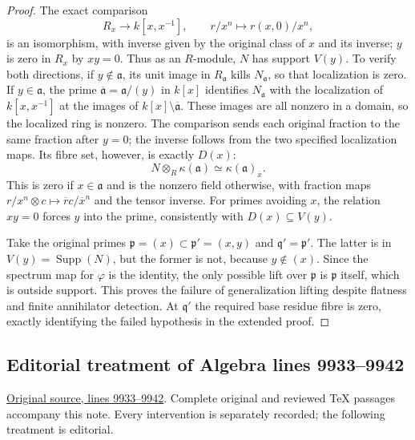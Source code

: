\begin{proof}
The exact comparison
$$
R_x\longrightarrow k[x,x^{-1}],\qquad
r/x^n\longmapsto r(x,0)/x^n,
$$
is an isomorphism, with inverse given by the
original class of $x$ and its inverse; $y$ is
zero in $R_x$ by $xy=0$. Thus as an $R$-module,
$N$ has support $V(y)$. To verify both directions,
if $y\notin\mathfrak a$, its unit image in
$R_{\mathfrak a}$ kills $N_{\mathfrak a}$,
so that localization is zero. If
$y\in\mathfrak a$, the prime
$\overline{\mathfrak a}=\mathfrak a/(y)$
in $k[x]$ identifies $N_{\mathfrak a}$ with
the localization of $k[x,x^{-1}]$ at the
images of $k[x]\setminus\overline{\mathfrak a}$.
These images are all nonzero in a domain,
so the localized ring is nonzero. The comparison
sends each original fraction to the same
fraction after $y=0$; the inverse follows from
the two specified localization maps.
Its fibre set, however, is exactly $D(x)$:
$$
N\otimes_R\kappa(\mathfrak a)
\simeq\kappa(\mathfrak a)_{\overline x}.
$$
This is zero if $x\in\mathfrak a$ and is the
nonzero field otherwise, with fraction maps
$r/x^n\otimes c\mapsto\overline r c/\overline x^n$
and the tensor inverse. For primes avoiding
$x$, the relation $xy=0$ forces $y$ into the
prime, consistently with $D(x)\subseteq V(y)$.

Take the original primes
$\mathfrak p=(x)\subset\mathfrak p'=(x,y)$
and $\mathfrak q'=\mathfrak p'$. The latter
is in $V(y)=\operatorname{Supp}(N)$, but the
former is not, because $y\notin(x)$.
Since the spectrum map for $\varphi$ is the
identity, the only possible lift over
$\mathfrak p$ is $\mathfrak p$ itself, which
is outside support. This proves the failure
of generalization lifting despite flatness
and finite annihilator detection. At
$\mathfrak q'$ the required base residue fibre
is zero, exactly identifying the failed
hypothesis in the extended proof.
\end{proof}


\subsection{Editorial treatment of Algebra lines 9933--9942}

\hypertarget{algebra-context-116}{}

\noindent\href{https://github.com/stacks/stacks-project/blob/a04446e57ec1fbc252a871afcec7752fb2807b14/algebra.tex\#L9933}{Original source, lines 9933--9942}. Complete original and reviewed TeX passages accompany this note. Every intervention is separately recorded; the following treatment is editorial.



